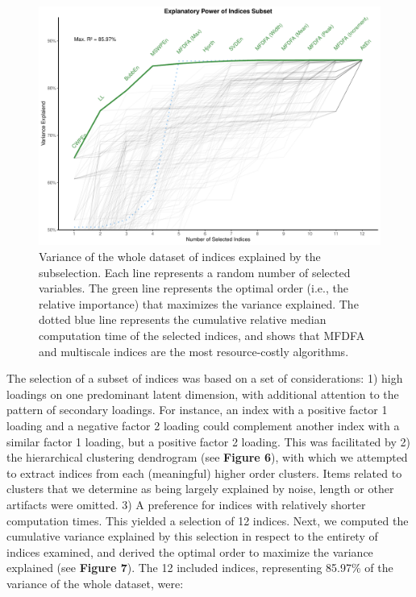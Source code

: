 \documentclass[
  man]{apa6}
\begin{document}
\begin{figure}
\centering
\includegraphics{./figures/varexplained-1.pdf}
\caption{\label{fig:varexplained}Variance of the whole dataset of indices explained by the subselection. Each line represents a random number of selected variables. The green line represents the optimal order (i.e., the relative importance) that maximizes the variance explained. The dotted blue line represents the cumulative relative median computation time of the selected indices, and shows that MFDFA and multiscale indices are the most resource-costly algorithms.}
\end{figure}

The selection of a subset of indices was based on a set of considerations: 1) high loadings on one predominant latent dimension, with additional attention to the pattern of secondary loadings. For instance, an index with a positive factor 1 loading and a negative factor 2 loading could complement another index with a similar factor 1 loading, but a positive factor 2 loading. This was facilitated by 2) the hierarchical clustering dendrogram (see \textbf{Figure 6}), with which we attempted to extract indices from each (meaningful) higher order clusters. Items related to clusters that we determine as being largely explained by noise, length or other artifacts were omitted. 3) A preference for indices with relatively shorter computation times. This yielded a selection of 12 indices. Next, we computed the cumulative variance explained by this selection in respect to the entirety of indices examined, and derived the optimal order to maximize the variance explained (see \textbf{Figure 7}). The 12 included indices, representing 85.97\% of the variance of the whole dataset, were:
\end{document}
